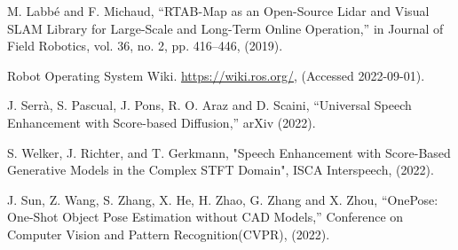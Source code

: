 \documentclass[a4j]{jarticle}
\begin{document}
\begin{thebibliography}{99}
M. Labbé and F. Michaud, “RTAB-Map as an Open-Source Lidar and Visual SLAM Library for Large-Scale and Long-Term Online Operation,” in Journal of Field Robotics, vol. 36, no. 2, pp. 416–446, (2019).

Robot Operating System Wiki. \url{https://wiki.ros.org/}, (Accessed 2022-09-01).

J. Serrà, S. Pascual, J. Pons, R. O. Araz and D. Scaini, “Universal Speech Enhancement with Score-based Diffusion,” arXiv (2022).

S. Welker, J. Richter, and T. Gerkmann, "Speech Enhancement with Score-Based Generative Models in the Complex STFT Domain", ISCA Interspeech, (2022).


J. Sun, Z. Wang, S. Zhang, X. He, H. Zhao, G. Zhang and X. Zhou, “OnePose: One-Shot Object Pose Estimation without CAD Models,” Conference on Computer Vision and Pattern Recognition(CVPR), (2022).

\end{thebibliography}
\end{document}
